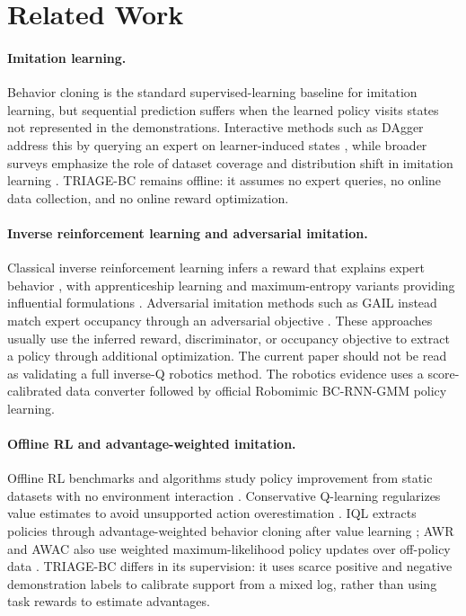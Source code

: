 \documentclass[11pt]{article}
\newcommand{\method}{TRIAGE-BC}
\begin{document}
\section{Related Work}

\paragraph{Imitation learning.}
Behavior cloning is the standard supervised-learning baseline for imitation learning, but sequential prediction suffers when the learned policy visits states not represented in the demonstrations. Interactive methods such as DAgger address this by querying an expert on learner-induced states \cite{ross2011dagger}, while broader surveys emphasize the role of dataset coverage and distribution shift in imitation learning \cite{osa2018algorithmic}. \method{} remains offline: it assumes no expert queries, no online data collection, and no online reward optimization.

\paragraph{Inverse reinforcement learning and adversarial imitation.}
Classical inverse reinforcement learning infers a reward that explains expert behavior \cite{ng2000irl}, with apprenticeship learning and maximum-entropy variants providing influential formulations \cite{abbeel2004apprenticeship,ziebart2008maxent}. Adversarial imitation methods such as GAIL instead match expert occupancy through an adversarial objective \cite{ho2016gail}. These approaches usually use the inferred reward, discriminator, or occupancy objective to extract a policy through additional optimization. The current paper should not be read as validating a full inverse-Q robotics method. The robotics evidence uses a score-calibrated data converter followed by official Robomimic BC-RNN-GMM policy learning.

\paragraph{Offline RL and advantage-weighted imitation.}
Offline RL benchmarks and algorithms study policy improvement from static datasets with no environment interaction \cite{fu2020d4rl}. Conservative Q-learning regularizes value estimates to avoid unsupported action overestimation \cite{kumar2020cql}. IQL extracts policies through advantage-weighted behavior cloning after value learning \cite{kostrikov2022iql}; AWR and AWAC also use weighted maximum-likelihood policy updates over off-policy data \cite{peng2019awr,nair2020awac}. \method{} differs in its supervision: it uses scarce positive and negative demonstration labels to calibrate support from a mixed log, rather than using task rewards to estimate advantages.
\end{document}
